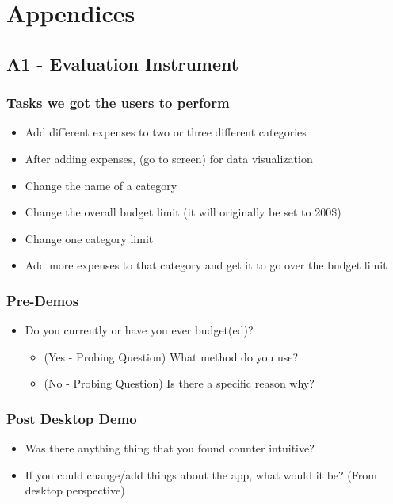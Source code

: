 \documentclass{chi2011}
\begin{document}
\section{Appendices}

	\subsection{A1 - Evaluation Instrument}
	
	\subsubsection{Tasks we got the users to perform}
	\begin{itemize}[noitemsep]
		\item Add different expenses to two or three different categories
		\item After adding expenses, (go to screen) for data visualization
		\item Change the name of a category
		\item Change the overall budget limit (it will originally be set to 200\$)
		\item Change one category limit
		\item Add more expenses to that category and get it to go over the budget limit
	\end{itemize}
		

	\subsubsection{Pre-Demos}
	\begin{itemize}[noitemsep]
		\item Do you currently or have you ever budget(ed)?
		\begin{itemize}[noitemsep]
			\item (Yes - Probing Question) What method do you use?
			\item (No - Probing Question) Is there a specific reason why?
		\end{itemize}
	\end{itemize}
	
	\subsubsection{Post Desktop Demo}
	\begin{itemize}[noitemsep]
		\item Was there anything thing that you found counter intuitive?
		\item If you could change/add things about the app, what would it be? (From desktop perspective)
	\end{itemize}
\end{document}
